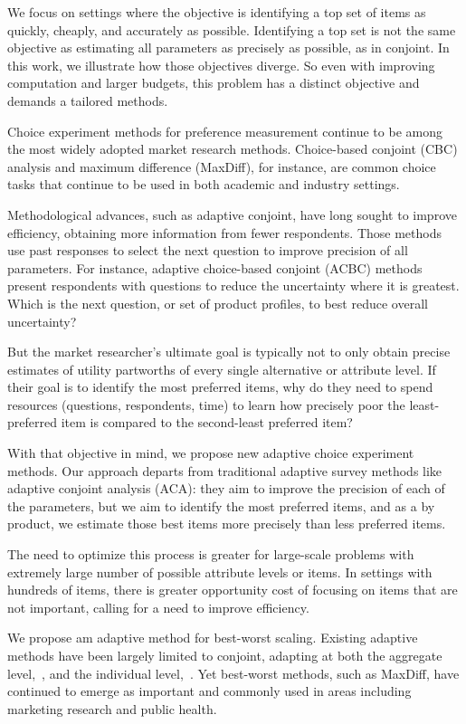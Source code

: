 \documentclass[nonblindrev]{informs3}
\begin{document}
We focus on settings where the objective is identifying a top set of items as quickly, cheaply, and accurately as possible. Identifying a top set is not the same objective as estimating all parameters as precisely as possible, as in conjoint. In this work, we illustrate how those objectives diverge. So even with improving computation and larger budgets, this problem has a distinct objective and demands a tailored methods. 

Choice experiment methods for preference measurement continue to be among the most widely adopted market research methods. Choice-based conjoint (CBC) analysis and maximum difference (MaxDiff), for instance, are common choice tasks that continue to be used in both academic and industry settings.

Methodological advances, such as adaptive conjoint, have long sought to improve efficiency, obtaining more information from fewer respondents. Those methods use past responses to select the next question to improve precision of all parameters. For instance, adaptive choice-based conjoint (ACBC) methods present respondents with questions to reduce the uncertainty where it is greatest. Which is the next question, or set of product profiles, to best reduce overall uncertainty?

But the market researcher's ultimate goal is typically not to only obtain precise estimates of utility partworths of every single alternative or attribute level. If their goal is to identify the most preferred items, why do they need to spend resources (questions, respondents, time) to learn how precisely poor the least-preferred item is compared to the second-least preferred item? 

With that objective in mind, we propose new adaptive choice experiment methods. Our approach departs from traditional adaptive survey methods like adaptive conjoint analysis (ACA): they aim to improve the precision of each of the parameters, but we aim to identify the most preferred items, and as a by product, we estimate those best items more precisely than less preferred items. 


The need to optimize this process is greater for large-scale problems with extremely large number of possible attribute levels or items.  In settings with hundreds of items, there is greater opportunity cost of focusing on items that are not important, calling for a need to improve efficiency.

We propose am adaptive method for best-worst scaling. Existing adaptive methods have been largely limited to conjoint, adapting at both the aggregate level,~\cite{arora2001improving}, and the individual level,~\cite{toubia2004polyhedral}. Yet best-worst methods, such as MaxDiff, have continued to emerge as important and commonly used in areas including marketing research and public health. 
\end{document}
